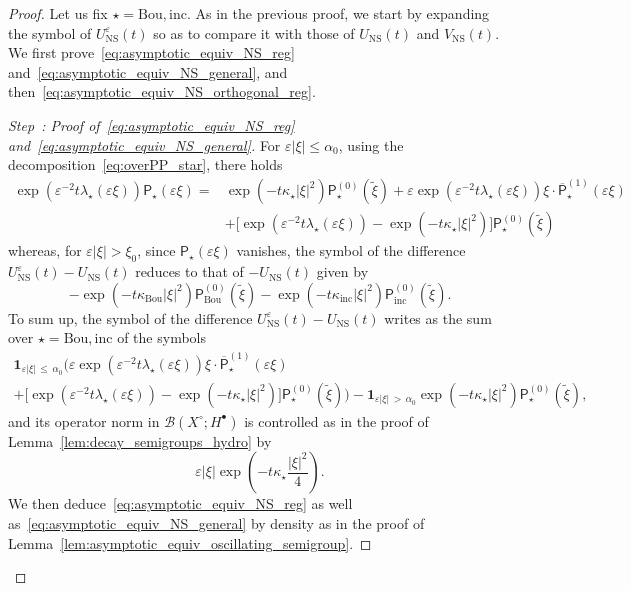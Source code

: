 \documentclass[AHL,Unicode,longabstracts,published]{cedram}
\newcommand{\ns}{\mathrm{NS}}
\newcommand{\Inc}{\mathrm{inc}}
\newcommand{\Bou}{\mathrm{Bou}}
\newcommand{\Burin}{\mathbf{1}}
\newcommand{\PP}{\mathsf{P}}
\newcommand{\BBB}{\mathscr{B}}
\newcommand{\Ssp}{H^{\bullet}}
\newcommand{\Slm}{X^{\circ}}
\renewcommand*\le{\leqslant}
\newcommand*\eps{{\varepsilon}}
\newcounter{stepcount}
\newenvironment{step}[1]{\refstepcounter{stepcount}\begin{proof}[Step~\thestepcount: #1]}{\let\qed\relax\end{proof}}
\begin{document}
\begin{proof}
Let us fix $\star=\Bou,\Inc$. As in the previous proof, we start by expanding the symbol of $U^\eps_\ns(t)$ so as to compare it with those of $U_\ns(t)$ and $V_\ns(t)$. We first prove~\eqref{eq:asymptotic_equiv_NS_reg} and~\eqref{eq:asymptotic_equiv_NS_general}, and then~\eqref{eq:asymptotic_equiv_NS_orthogonal_reg}.

\setcounter{stepcount}{0}
\begin{step}{{Proof of~\eqref{eq:asymptotic_equiv_NS_reg} and~\eqref{eq:asymptotic_equiv_NS_general}}}\label{prflemm4.4step1}
For $\eps | \xi | \le \alpha_0$, using the decomposition~\eqref{eq:overPP_star}, there holds
\begin{align*}
\exp\left(\eps^{-2} t \lambda_\star(\eps \xi) \right) \PP_\star(\eps \xi) = & \exp\left(- t \kappa_\star | \xi |^2 \right) \PP_\star^{(0)}\left(\widetilde{\xi} \right) + \eps \exp\left(\eps^{-2} t \lambda_\star(\eps \xi) \right)\xi \cdot \overline{\PP}_\star^{(1)}(\eps \xi) \\
& + \Big[\exp\left(\eps^{-2} t \lambda_\star(\eps \xi) \right) - \exp\left(- t \kappa_\star | \xi |^2 \right) \Big] \PP^{(0)}_\star\left(\widetilde{\xi} \right)
\end{align*}
whereas, for $\eps | \xi| > \xi_0$, since $\PP_\star(\eps \xi)$ vanishes, the symbol of the difference $U^\eps_\ns(t) - U_\ns(t)$ reduces to that of $-U_\ns(t)$ given by
\[
-\exp\left(- t \kappa_\Bou | \xi |^2 \right) \PP_\Bou^{(0)}\left(\widetilde{\xi} \right) - \exp\left(-t\kappa_{\Inc}|\xi|^{2}\right)\PP_{\Inc}^{(0)}\left(\widetilde{\xi}\right).
\]
To sum up, the symbol of the difference $U_\ns^\eps(t) - U_\ns (t)$ writes as the sum over $\star=\Bou,\Inc$ of the symbols
\begin{multline*}
\Burin_{\eps | \xi |\,\le\,\alpha_0} \Big(\eps \exp\left(\eps^{-2} t \lambda_\star(\eps \xi) \right)\xi \cdot \overline{\PP}_\star^{(1)}(\eps \xi) \\ + \Big[\exp\left(\eps^{-2} t \lambda_\star(\eps \xi) \right) - \exp\left(- t \kappa_\star | \xi |^2 \right) \Big] \PP^{(0)}_\star\left(\widetilde{\xi} \right) \Big) 
- \Burin_{\eps | \xi |\,>\,\alpha_0} \exp\left(- t \kappa_\star | \xi |^2 \right) \PP_\star^{(0)}\left(\widetilde{\xi} \right),
\end{multline*}
and its operator norm in $\BBB(\Slm ; \Ssp)$ is controlled as in the proof of Lemma~\ref{lem:decay_semigroups_hydro} by
\[
\eps | \xi | \exp\left(- t \kappa_\star \frac{| \xi |^2}{4} \right).
\]
We then deduce~\eqref{eq:asymptotic_equiv_NS_reg} as well as~\eqref{eq:asymptotic_equiv_NS_general} by density as in the proof of Lemma~\ref{lem:asymptotic_equiv_oscillating_semigroup}.

\end{step}
\end{proof}
\end{document}
